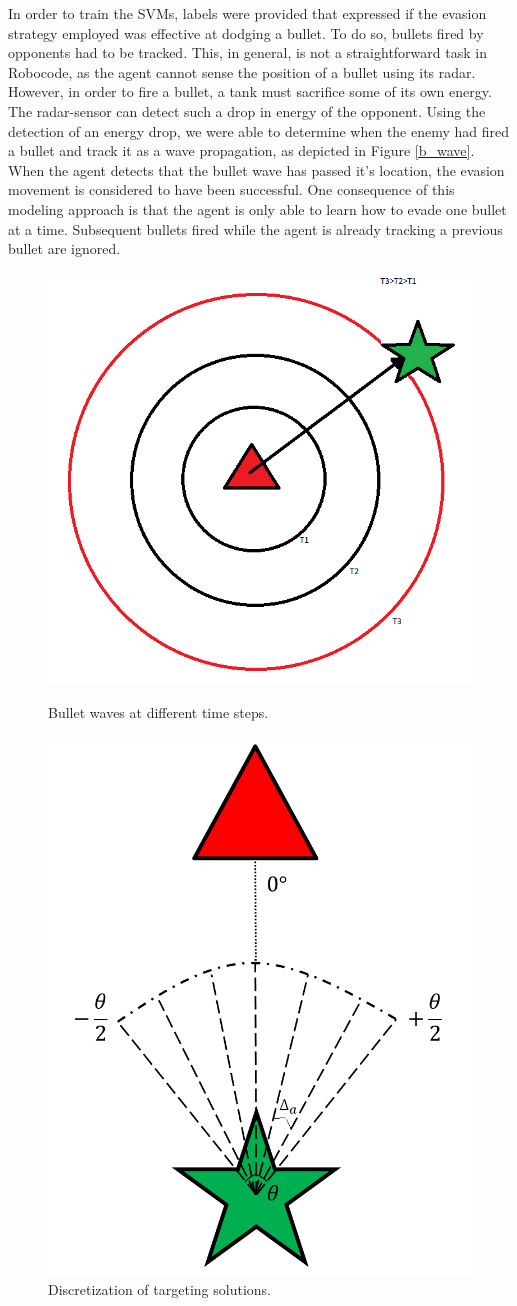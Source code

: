 \documentclass{article}
\theoremstyle{plain}
\theoremstyle{definition}
\theoremstyle{remark}
\begin{document}
In order to train the SVMs, labels were provided that expressed if the evasion strategy employed was effective at dodging a bullet. To do so, bullets fired by opponents had to be tracked. This, in general, is not a straightforward task in Robocode, as the agent cannot sense the position of a bullet using its radar. However, in order to fire a bullet, a tank must sacrifice some of its own energy. The radar-sensor can detect such a drop in energy of the opponent. Using the detection of an energy drop, we were able to determine when the enemy had fired a bullet and track it as a wave propagation, as depicted in Figure \ref{b_wave}. When the agent detects that the bullet wave has passed it's location, the evasion movement is considered to have been successful. One consequence of this modeling approach is that the agent is only able to learn how to evade one bullet at a time. Subsequent bullets fired while the agent is already tracking a previous bullet are ignored.

\begin{figure}[t]
\begin{minipage}[b]{0.5\linewidth}
	\centering
		\includegraphics[width=5 cm]{bullet_wave.png}
	\caption{Bullet waves at different time steps.}
	\label{b_wave}
\end{minipage}
\hspace{0.5cm}
\begin{minipage}[b]{0.5\linewidth}
\centering
		\includegraphics[width=5 cm]{targeting.png}
	\caption{Discretization of targeting solutions.}
	\label{tget}
\end{minipage}
\end{figure}
\end{document}
